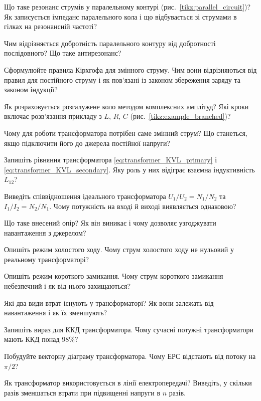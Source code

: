 \begin{Questions}
\begin{quizlist}
	\item Що таке резонанс струмів у паралельному контурі (рис.~\ref{tikz:parallel_circuit})? Як записується імпеданс паралельного кола і що відбувається зі струмами в гілках на резонансній частоті?
	\item Чим відрізняється добротність паралельного контуру від добротності послідовного? Що таке антирезонанс?
	\item Сформулюйте правила Кірхгофа для змінного струму. Чим вони відрізняються від правил для постійного струму і як пов'язані із законом збереження заряду та законом індукції?
	\item Як розраховується розгалужене коло методом комплексних амплітуд? Які кроки включає розв'язання прикладу з $L$, $R$, $C$ (рис.~\ref{tikz:example_branched})?
	\item Чому для роботи трансформатора потрібен саме змінний струм? Що станеться, якщо підключити його до джерела постійної напруги?
	\item Запишіть рівняння трансформатора \eqref{eq:transformer_KVL_primary} і \eqref{eq:transformer_KVL_secondary}. Яку роль у них відіграє взаємна індуктивність $L_{12}$?
	\item Виведіть співвідношення ідеального трансформатора $U_1/U_2 = N_1/N_2$ та $I_1/I_2 = N_2/N_1$. Чому потужність на вході й виході виявляється однаковою?
	\item Що таке внесений опір? Як він виникає і чому дозволяє узгоджувати навантаження з джерелом?
	\item Опишіть режим холостого ходу. Чому струм холостого ходу не нульовий у реальному трансформаторі?
	\item Опишіть режим короткого замикання. Чому струм короткого замикання небезпечний і як від нього захищаються?
	\item Які два види втрат існують у трансформаторі? Як вони залежать від навантаження і як їх зменшують?
	\item Запишіть вираз для ККД трансформатора. Чому сучасні потужні трансформатори мають ККД понад $98\%$?
	\item Побудуйте векторну діаграму трансформатора. Чому ЕРС відстають від потоку на $\pi/2$?
	\item Як трансформатор використовується в лінії електропередачі? Виведіть, у скільки разів зменшаться втрати при підвищенні напруги в $n$ разів.

\end{quizlist}
\end{Questions}
